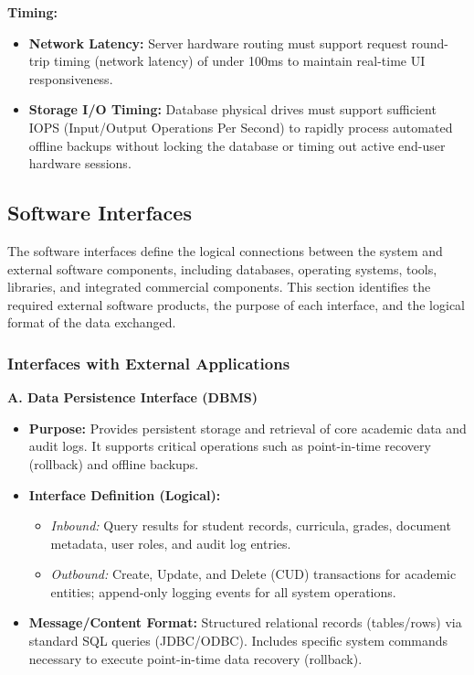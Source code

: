 \documentclass[11pt, a4paper]{article}
\begin{document}
\textbf{Timing:}
\begin{itemize}
    \item \textbf{Network Latency:} Server hardware routing must support request round-trip timing (network latency) of under 100ms to maintain real-time UI responsiveness.
    \item \textbf{Storage I/O Timing:} Database physical drives must support sufficient IOPS (Input/Output Operations Per Second) to rapidly process automated offline backups without locking the database or timing out active end-user hardware sessions.
\end{itemize}

\subsection{Software Interfaces}
The software interfaces define the logical connections between the system and external software components, including databases, operating systems, tools, libraries, and integrated commercial components. This section identifies the required external software products, the purpose of each interface, and the logical format of the data exchanged.

\subsubsection{Interfaces with External Applications}

\textbf{A. Data Persistence Interface (DBMS)}
\begin{itemize}
    \item \textbf{Purpose:} Provides persistent storage and retrieval of core academic data and audit logs. It supports critical operations such as point-in-time recovery (rollback) and offline backups.
    \item \textbf{Interface Definition (Logical):}
    \begin{itemize}
        \item \textit{Inbound:} Query results for student records, curricula, grades, document metadata, user roles, and audit log entries.
        \item \textit{Outbound:} Create, Update, and Delete (CUD) transactions for academic entities; append-only logging events for all system operations.
    \end{itemize}
    \item \textbf{Message/Content Format:} Structured relational records (tables/rows) via standard SQL queries (JDBC/ODBC). Includes specific system commands necessary to execute point-in-time data recovery (rollback).
\end{itemize}
\end{document}
